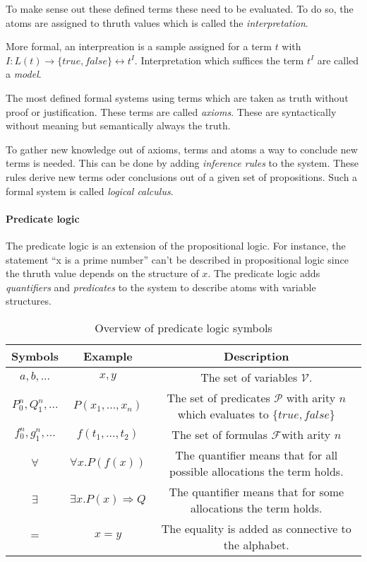 To make sense out these defined terms these need to be evaluated. To do so,
the atoms are assigned to thruth values which is called the \textit{interpretation}.~\cite{tuschik1994mathematische}

\begin{defi}
  More formal, an interpreation is a sample assigned for a term $t$ with
  $I:L(t)\rightarrow \{true,false\} \leftrightarrow t^I$. Interpretation which suffices the term
  $t^I$ are called a \textit{model}.
\end{defi}

The most defined formal systems using terms which are taken as truth without
proof or justification. These terms are called \textit{axioms}. These are syntactically
without meaning but semantically always the truth.~\cite{tuschik1994mathematische}

To gather new knowledge out of axioms, terms and atoms a way to conclude
new terms is needed. This can be done by adding \textit{inference rules} to
the system. These rules derive new terms oder conclusions out of a given
set of propositions. Such a formal system is called \textit{logical calculus}.~\cite{tuschik1994mathematische}


\paragraph{Predicate logic}
The predicate logic is an extension of the propositional logic.
For instance, the statement ``x is a prime number'' can't be described
in propositional logic since the thruth value depends on the structure of $x$.
The predicate logic adds \textit{quantifiers} and \textit{predicates} to the
system to describe atoms with variable structures.~\cite{heinemann2013logik}

\begin{table}[h]
  \centering
  \begin{tabular}{c|c|c}
    Symbols & Example & Description\\\hline
    $a,b,...$ & $x,y$ & The set of variables $\mathcal{V}$.\\
    $P_0^n,Q_1^n,...$ & $P(x_1,...,x_n)$ & The set of predicates $\mathcal{P}$ with arity $n$
                                          which evaluates to $\{true,false\}$\\
    $f_0^n,g_1^n,...$ & $f(t_1,...,t_2)$ & The set of formulas $\mathcal{F}$with arity $n$\\
    $\forall$ & $\forall x.P(f(x))$ & The quantifier means that for all possible allocations the term holds.\\
    $\exists$ & $\exists x.P(x)\Rightarrow Q$ & The quantifier means that for some allocations the term holds.\\
    $=$ & $x = y$ & The equality is added as connective to the alphabet.\\
  \end{tabular}
  \caption{Overview of predicate logic symbols}
  \label{tab:predlogic}
\end{table}

